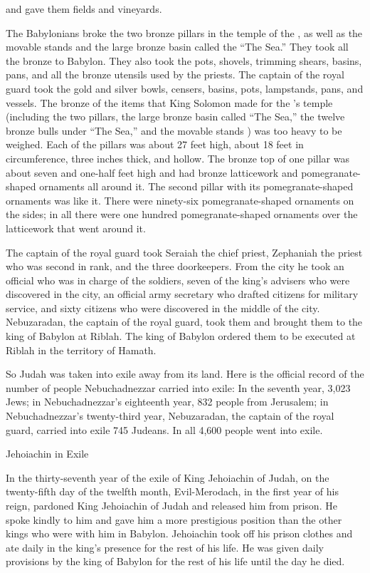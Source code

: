 {and gave them fields
and vineyards.
\par }{\PP {}The Babylonians
broke
the
two bronze
pillars
in the temple
of the {}, as well as
the
movable stands
and the large bronze
basin called the “The Sea.”
They took
all
the bronze
to Babylon.
They also took
the pots,
shovels,
trimming shears,
basins,
pans,
and all
the bronze
utensils
used by the priests.
The captain
of the royal guard
took
the gold
and silver
bowls,
censers,
basins,
pots,
lampstands,
pans,
and vessels.
The bronze
of the items
that
King
Solomon
made
for the
{}’s
temple
(including the two
pillars,
the large bronze basin
called “The Sea,”
the twelve
bronze
bulls
under
“The Sea,” and the movable stands
) was too heavy to be
weighed.
Each of the pillars
was about 27 feet
high,
about 18 feet
in circumference,
three
inches
thick,
and hollow.
The bronze
top of
one
pillar
was about seven and one-half feet
high
and had bronze
latticework
and pomegranate-shaped
ornaments
all
around
it. The second
pillar
with its pomegranate-shaped ornaments was like it.
There were
ninety-six
pomegranate-shaped ornaments
on the sides;
in all
there were one hundred
pomegranate-shaped ornaments
over
the latticework
that went around it.
\par }{\PP {}The captain
of the royal guard
took
Seraiah
the chief
priest,
Zephaniah
the priest
who was second
in rank, and the three
doorkeepers.
From
the city
he took
an official
who
was in charge of
the soldiers,
seven
of the king’s
advisers
who
were discovered
in the
city,
an official
army
secretary
who drafted
citizens
for military service, and sixty
citizens
who were discovered
in the middle
of the city.
Nebuzaradan,
the captain
of the royal guard,
took
them and brought
them to
the king
of Babylon
at Riblah.
The king
of Babylon
ordered
them to be executed
at Riblah
in the territory
of Hamath.
\par }{\PP So Judah
was taken into exile
away from its land.
Here
is the official record of the number of people
Nebuchadnezzar
carried into exile: In the seventh
year,
3,023
Jews;
in Nebuchadnezzar’s
eighteenth
year,
832
people
from Jerusalem;
in Nebuchadnezzar’s
twenty-third
year,
Nebuzaradan,
the captain
of the royal guard,
carried into exile
745
Judeans.
In all
4,600
people went into exile.
\par }{\SH Jehoiachin in Exile
\par }{\PP {}In the thirty-seventh
year
of the exile
of King
Jehoiachin
of Judah,
on the twenty-fifth
day of the twelfth
month,
Evil-Merodach,
in the first year
of his reign,
pardoned
King
Jehoiachin
of Judah
and released
him from prison.
He spoke
kindly
to him
and gave
him a more prestigious
position
than the other kings
who
were with
him in Babylon.
Jehoiachin took off
his prison
clothes
and ate
daily
in the king’s presence
for the rest
of his life.
He was given
daily
provisions
by the king
of Babylon
for the rest of his life until
the day
he died.

\par }